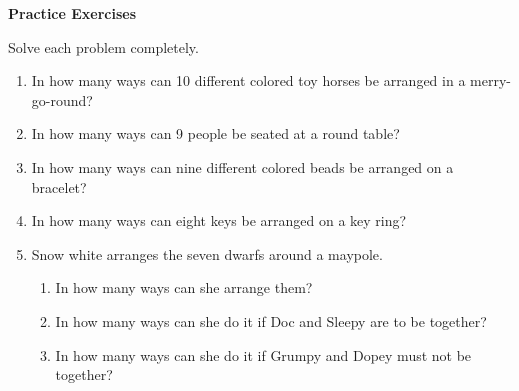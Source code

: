 \textbf{Practice Exercises}

\vspce

Solve each problem completely. 

\begin{enumerate}[label = \arabic*. ]
\item In how many ways can 10 different colored toy horses be arranged in a merry-go-round? 
\item In how many ways can 9 people be seated at a round table?
\item In how many ways can nine different colored beads be arranged on a bracelet?
\item In how many ways can eight keys be arranged on a key ring?
\item Snow white arranges the seven dwarfs around a maypole. 

\begin{enumerate}[label = \alph*. ]
\item In how many ways can she arrange them?
\item In how many ways can she do it if Doc and Sleepy are to be together?
\item In how many ways can she do it if Grumpy and Dopey must not be together?
\end{enumerate}   



\end{enumerate} 



 

